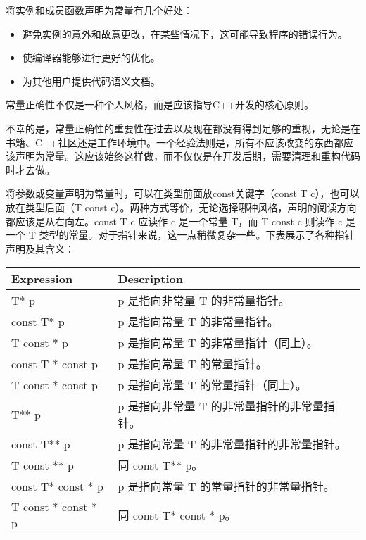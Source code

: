 
将实例和成员函数声明为常量有几个好处：

\begin{itemize}
\item
避免实例的意外和故意更改，在某些情况下，这可能导致程序的错误行为。

\item
使编译器能够进行更好的优化。

\item
为其他用户提供代码语义文档。
\end{itemize}

\begin{myNotic}
常量正确性不仅是一种个人风格，而是应该指导C++开发的核心原则。
\end{myNotic}

不幸的是，常量正确性的重要性在过去以及现在都没有得到足够的重视，无论是在书籍、C++社区还是工作环境中。一个经验法则是，所有不应该改变的东西都应该声明为常量。这应该始终这样做，而不仅仅是在开发后期，需要清理和重构代码时才去做。

将参数或变量声明为常量时，可以在类型前面放const关键字（const T c），也可以放在类型后面（T const c）。两种方式等价，无论选择哪种风格，声明的阅读方向都应该是从右向左。const T c 应读作 c 是一个常量 T，而 T const c 则读作 c 是一个 T 类型的常量。对于指针来说，这一点稍微复杂一些。下表展示了各种指针声明及其含义：

\begin{longtable}{|l|l|}
\hline
\textbf{Expression} & \textbf{Description}                                                       \\ \hline
\endfirsthead
%
\endhead
%
T* p                & p 是指向非常量 T 的非常量指针。                           \\ \hline
const T* p          & p 是指向常量 T 的非常量指针。                       \\ \hline
T const * p         & p 是指向常量 T 的非常量指针（同上）。     \\ \hline
const T * const p   & p 是指向常量 T 的常量指针。                           \\ \hline
T const * const p  & p 是指向常量 T 的常量指针（同上）。        \\ \hline
T** p               & p 是指向非常量 T 的非常量指针的非常量指针。 \\ \hline
const T** p         & p 是指向常量 T 的非常量指针的非常量指针。     \\ \hline
T const ** p        & 同 const T** p。                                                       \\ \hline
const T* const * p & p 是指向常量 T 的常量指针的非常量指针。 \\ \hline
T const * const * p & 同 const T* const * p。                                                \\ \hline
\end{longtable}

